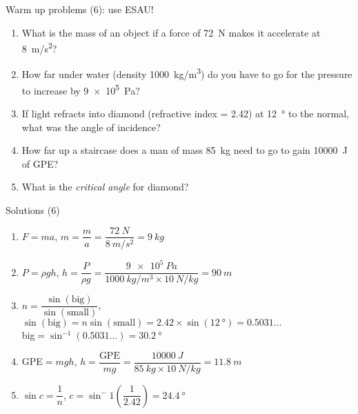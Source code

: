\documentclass[14pt]{beamer}
\begin{document}
\begin{frame}{Warm up problems (6): use ESAU!}
\vspace*{-0.8em}\begin{enumerate}
\item\label{2.2} What is the mass of an object if a force of \SI{72}{N} makes it accelerate at \SI{8}{m/s^{2}}?
\item\label{18.3} How far under water (density \SI{1000}{kg/m^3}) do you have to go for the pressure to increase by \SI{9e5}{Pa}?
\item\label{15.2} If light refracts into diamond (refractive index = 2.42) at \SI{12}{\degree} to the normal, what was the angle of incidence?
\item\label{7.3} How far up a staircase does a man of mass \SI{85}{kg} need to go to gain \SI{10000}{J} of GPE?
\item\label{16.3} What is the \emph{critical angle} for diamond?
\end{enumerate}
\end{frame}

\begin{frame}{Solutions (6)}
\vspace*{-0.8em}\begin{enumerate}
\item\label{2.2} $F=ma$, $m=\dfrac{m}{a}=\dfrac{\SI{72}{N}}{\SI{8}{m/s^2}}=\SI{9}{kg}$
\item\label{18.3} $P=\rho gh$, $h=\dfrac{P}{\rho g}=\dfrac{\SI{9e5}{Pa}}{\SI{1000}{kg/m^3}\times\SI{10}{N/kg}}=\SI{90}{m}$
\item\label{15.2} $n=\dfrac{\sin(\text{big})}{\sin(\text{small})}$, $\sin(\text{big})=n \sin(\text{small})=2.42\times\sin(\SI{12}{\degree})=0.5031\ldots$\\
big$=\sin^{-1}(0.5031\ldots)=\SI{30.2}{\degree}$
\item\label{7.3} GPE$=mgh$, $h=\dfrac{\text{GPE}}{mg}=\dfrac{\SI{10000}{J}}{\SI{85}{kg}\times\SI{10}{N/kg}}=\SI{11.8}{m}$
\item\label{16.3} $\sin c = \dfrac{1}{n}$, $c=\sin^-1\left(\dfrac{1}{2.42}\right)=\SI{24.4}{\degree}$
\end{enumerate}
\end{frame}
\end{document}
